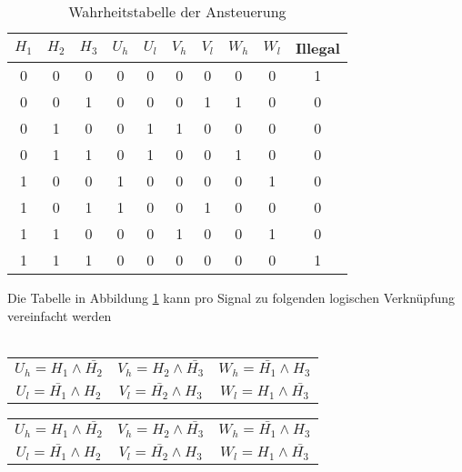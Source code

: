         \begin{table}[h!]
            \begin{tabular}{ccc||cc|cc|cc||c}
                 $H_1$ & $H_2$ & $H_3$ & $U_h$ & $U_l$ & $V_h$ & $V_l$ & $W_h$ & $W_l$ & Illegal\\
            \hline 0   &   0   &   0   &   0   &   0   &   0   &   0   &   0   &   0   &   1\\
                   0   &   0   &   1   &   0   &   0   &   0   &   1   &   1   &   0   &   0\\
                   0   &   1   &   0   &   0   &   1   &   1   &   0   &   0   &   0   &   0\\
                   0   &   1   &   1   &   0   &   1   &   0   &   0   &   1   &   0   &   0\\
                   1   &   0   &   0   &   1   &   0   &   0   &   0   &   0   &   1   &   0\\
                   1   &   0   &   1   &   1   &   0   &   0   &   1   &   0   &   0   &   0\\
                   1   &   1   &   0   &   0   &   0   &   1   &   0   &   0   &   1   &   0\\
                   1   &   1   &   1   &   0   &   0   &   0   &   0   &   0   &   0   &   1\\
            \end{tabular}
           	\centering
           	\caption{Wahrheitstabelle der Ansteuerung} 
            \label{abb:WahrheitstabelleAnsteuerung}
        \end{table}
        \parindent 0pt Die Tabelle in Abbildung 
        \ref{abb:WahrheitstabelleAnsteuerung} kann pro Signal zu folgenden 
        logischen Verknüpfung vereinfacht werden\\
        \\
    \ifSTANDALONE
        \begin{table}
            \centering
            \begin{tabular}{ccc}
                $U_h = H_1 \wedge \bar{H_2}$ & $V_h = H_2 \wedge \bar{H_3}$ & $W_h = \bar{H_1} \wedge H_3$\\
                $U_l = \bar{H_1} \wedge H_2$ & $V_l = \bar{H_2} \wedge H_3$ & $W_l = H_1 \wedge \bar{H_3}$
            \end{tabular}
        \end{table}
    \fi
    \ifEMBED
        \begin{tabular}{ccc}
            $U_h = H_1 \wedge \bar{H_2}$ & $V_h = H_2 \wedge \bar{H_3}$ & $W_h = \bar{H_1} \wedge H_3$\\
            $U_l = \bar{H_1} \wedge H_2$ & $V_l = \bar{H_2} \wedge H_3$ & $W_l = H_1 \wedge \bar{H_3}$
        \end{tabular}
    \fi
    \ifSTANDALONE
